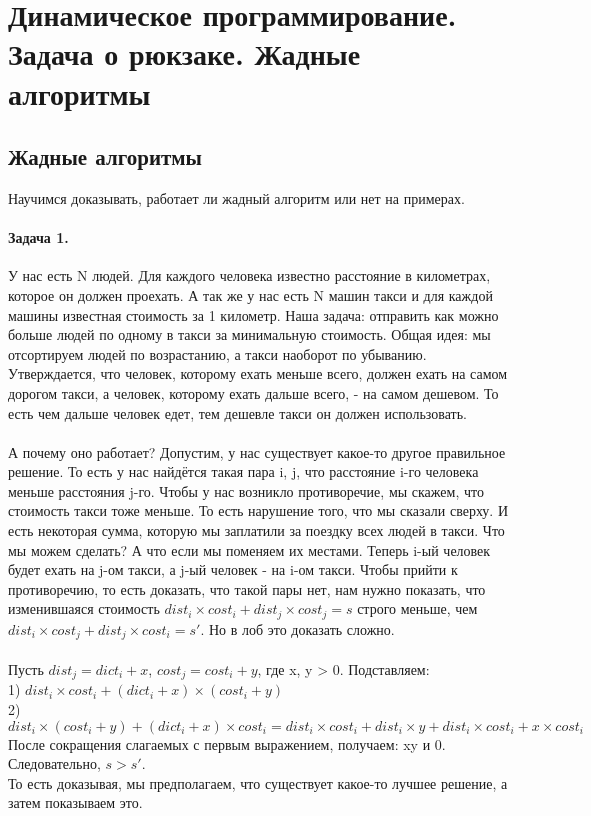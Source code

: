 \documentclass[a4paper,12pt]{article}
\begin{document}
\section{Динамическое программирование. Задача о рюкзаке. Жадные алгоритмы}
\subsection{Жадные алгоритмы}
Научимся доказывать, работает ли жадный алгоритм или нет на примерах. 
\paragraph{Задача 1.} У нас есть N людей. Для каждого человека известно расстояние в километрах, которое он должен проехать. А так же у нас есть N машин такси и для каждой машины известная стоимость за 1 километр. Наша задача: отправить как можно больше людей по одному в такси за минимальную стоимость. Общая идея: мы отсортируем людей по возрастанию, а такси наоборот по убыванию. Утверждается, что человек, которому ехать меньше всего, должен ехать на самом дорогом такси, а человек, которому ехать дальше всего, - на самом дешевом. То есть чем дальше человек едет, тем дешевле такси он должен использовать.\\ \\ А почему оно работает? Допустим, у нас существует какое-то другое правильное решение. То есть у нас найдётся такая пара i, j, что расстояние i-го человека меньше расстояния j-го. Чтобы у нас возникло противоречие, мы скажем, что стоимость такси тоже меньше. То есть нарушение того, что мы сказали сверху. И есть некоторая сумма, которую мы заплатили за поездку всех людей в такси. Что мы можем сделать? А что если мы поменяем их местами. Теперь i-ый человек будет ехать на j-ом такси, а j-ый человек - на i-ом такси. Чтобы прийти к противоречию, то есть доказать, что такой пары нет, нам нужно показать, что изменившаяся стоимость $dist_i \times cost_i + dist_j \times cost_j = s$ строго меньше, чем $dist_i \times cost_j + dist_j \times cost_i = s'$. Но в лоб это доказать сложно. \\
\\
Пусть $dist_j = dict_i + x$, $cost_j = cost_i + y$, где x, y > 0. Подставляем:\\
1) $dist_i \times cost_i + (dict_i + x) \times (cost_i + y)$\\
2) $dist_i \times (cost_i + y) + (dict_i + x) \times cost_i = dist_i \times cost_i + dist_i \times y + dist_i \times cost_i + x \times cost_i$ \\
После сокращения слагаемых с первым выражением, получаем: xy и 0. Следовательно, $s > s'$.\\
То есть доказывая, мы предполагаем, что существует какое-то лучшее решение, а затем показываем это. 
\end{document}
